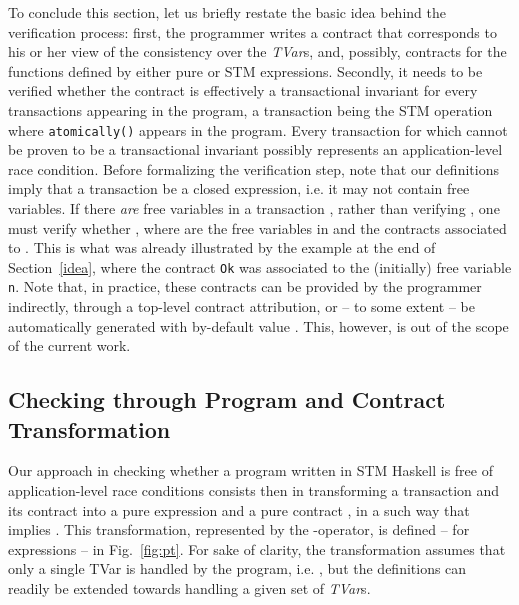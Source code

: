 \documentclass[submission,copyright,creativecommons]{eptcs}
\begin{document}
To conclude this section, let us briefly restate the basic idea behind the verification process: first, the programmer writes a contract  that corresponds to his or her view of the consistency over the \emph{TVar}s, and, possibly, contracts for the functions defined by either pure or STM expressions. Secondly, 
it needs to be verified whether the contract  is effectively a transactional invariant for every transactions appearing in the program, a transaction being the STM operation  where \texttt{atomically(}\texttt{)} appears in the program. 
Every transaction for which  cannot be proven to be a transactional invariant possibly represents an application-level race condition.
Before formalizing the verification step, note that our definitions imply that a transaction be a closed expression, i.e. it may not contain free variables. If there \emph{are} free variables in a transaction , rather than verifying , one must verify whether  ,
 where  are the free variables in  and   the contracts associated to . 
This is what was already illustrated by the example at the end of Section~\ref{idea}, where the contract \texttt{Ok} was associated to the (initially) free variable \texttt{n}. Note that, in practice, these contracts can be provided by the programmer indirectly, through a top-level contract attribution, or -- to some extent -- be automatically generated with by-default value \cite{static-contract-checking}. This, however, is out of the scope of the current work.


\subsection{Checking through Program and Contract Transformation}
\label{checking}


Our approach in checking whether a program written in STM Haskell is free of application-level race conditions consists then in transforming a transaction  and its contract  into a pure expression  and a pure contract , in a such way that  implies . This transformation, represented by the -operator, is defined -- for expressions -- in Fig.~\ref{fig:pt}. For sake of clarity, the transformation assumes that only a single TVar is handled by the program, i.e. , but the definitions can readily be extended towards handling a given set of \emph{TVar}s.
\begin{figure*}[t]
  \centering
\caption{-transformation for  expressions}
  \label{fig:pt}
\end{figure*}
\end{document}
